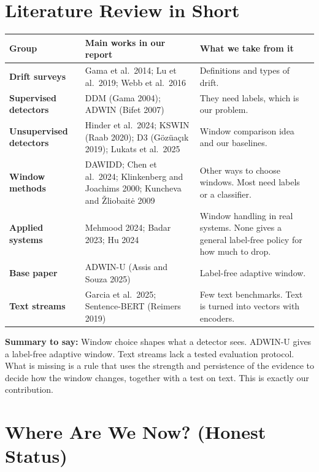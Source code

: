\documentclass[11pt,a4paper]{article}
\begin{document}
\section{Literature Review in Short}

\begin{center}
\small
\begin{tabular}{@{}>{\bfseries}p{3.1cm}p{5.2cm}p{4.9cm}@{}}
\toprule
Group & Main works in our report & What we take from it \\
\midrule
Drift surveys & Gama et al.\ 2014; Lu et al.\ 2019; Webb et al.\ 2016 & Definitions and types of drift. \\
Supervised detectors & DDM (Gama 2004); ADWIN (Bifet 2007) & They need labels, which is our problem. \\
Unsupervised detectors & Hinder et al.\ 2024; KSWIN (Raab 2020); D3 (G\"oz\"ua\c{c}\i k 2019); Lukats et al.\ 2025 & Window comparison idea and our baselines. \\
Window methods & DAWIDD; Chen et al.\ 2024; Klinkenberg and Joachims 2000; Kuncheva and \v{Z}liobait\.{e} 2009 & Other ways to choose windows. Most need labels or a classifier. \\
Applied systems & Mehmood 2024; Badar 2023; Hu 2024 & Window handling in real systems. None gives a general label-free policy for how much to drop. \\
Base paper & ADWIN-U (Assis and Souza 2025) & Label-free adaptive window. \\
Text streams & Garcia et al.\ 2025; Sentence-BERT (Reimers 2019) & Few text benchmarks. Text is turned into vectors with encoders. \\
\bottomrule
\end{tabular}
\end{center}

\textbf{Summary to say:} Window choice shapes what a detector sees. ADWIN-U gives a label-free adaptive window. Text streams lack a tested evaluation protocol. What is missing is a rule that uses the strength and persistence of the evidence to decide how the window changes, together with a test on text. This is exactly our contribution.

\section{Where Are We Now? (Honest Status)}
\end{document}
